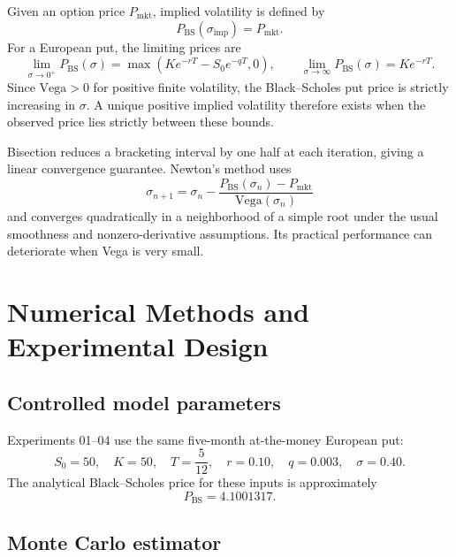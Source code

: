 \documentclass[11pt,a4paper]{article}
\newcommand{\Vega}{\mathrm{Vega}}
\begin{document}
Given an option price $P_{\mathrm{mkt}}$, implied volatility is defined by
\begin{equation}
  P_{\mathrm{BS}}(\sigma_{\mathrm{imp}})=P_{\mathrm{mkt}}.
\end{equation}
For a European put, the limiting prices are
\begin{equation}
  \lim_{\sigma\to0^+}P_{\mathrm{BS}}(\sigma)
  =\max(Ke^{-rT}-S_0e^{-qT},0),\qquad
  \lim_{\sigma\to\infty}P_{\mathrm{BS}}(\sigma)=Ke^{-rT}.
\end{equation}
Since $\Vega>0$ for positive finite volatility, the Black--Scholes put price is strictly increasing in $\sigma$. A unique positive implied volatility therefore exists when the observed price lies strictly between these bounds.

Bisection reduces a bracketing interval by one half at each iteration, giving a linear convergence guarantee. Newton's method uses
\begin{equation}
  \sigma_{n+1}=\sigma_n-
  \frac{P_{\mathrm{BS}}(\sigma_n)-P_{\mathrm{mkt}}}
  {\Vega(\sigma_n)}
\end{equation}
and converges quadratically in a neighborhood of a simple root under the usual smoothness and nonzero-derivative assumptions. Its practical performance can deteriorate when Vega is very small.

\section{Numerical Methods and Experimental Design}

\subsection{Controlled model parameters}

Experiments 01--04 use the same five-month at-the-money European put:
\begin{equation}
  S_0=50,\quad K=50,\quad T=\frac{5}{12},\quad
  r=0.10,\quad q=0.003,\quad \sigma=0.40.
  \label{eq:baseparams}
\end{equation}
The analytical Black--Scholes price for these inputs is approximately
\begin{equation}
  P_{\mathrm{BS}}=4.1001317.
\end{equation}

\subsection{Monte Carlo estimator}
\end{document}
